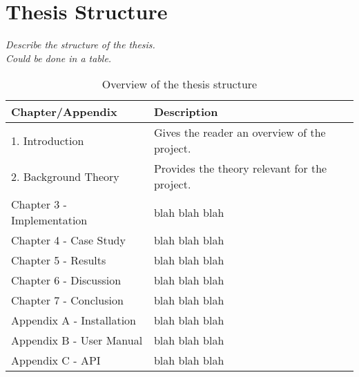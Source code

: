 \section{Thesis Structure}

\textit{Describe the structure of the thesis. \\
Could be done in a table.}

\begin{table}[!h]
\begin{center}
\begin{tabular}{ | l | l |}
\hline
\textbf{Chapter/Appendix} & \textbf{Description} \\ \hline
1. Introduction & Gives the reader an overview of the project. \\ \hline
2. Background Theory & Provides the theory relevant for the project. \\ \hline
Chapter 3 - Implementation & blah blah blah \\ \hline
Chapter 4 - Case Study & blah blah blah \\ \hline
Chapter 5 - Results & blah blah blah \\ \hline
Chapter 6 - Discussion & blah blah blah \\ \hline
Chapter 7 - Conclusion & blah blah blah \\ \hline
Appendix A - Installation & blah blah blah \\ \hline
Appendix B - User Manual & blah blah blah \\ \hline
Appendix C - API & blah blah blah \\ \hline
\end{tabular}
\end{center}
\caption{Overview of the thesis structure}
\label{Tab1}
\end{table}

\cleardoublepage